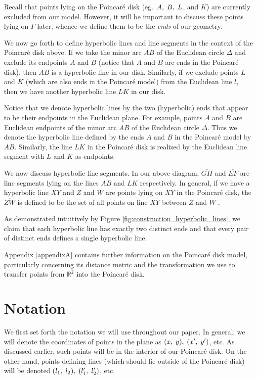 \documentclass[12pt]{article}
\newcommand{\R}{\mathbb{R}}
\newcommand{\ttc}{, \hspace{1mm}}
\newcommand{\poincare}{Poincar\'{e} }
\theoremstyle{plain}
\theoremstyle{definition}
\newcommand{\todo}[1]{\color{magenta} \text{{#1}} \color{black}}
\begin{document}
Recall that points lying on the \poincare disk (eg.~$A\ttc B \ttc L$, and $K$) are currently excluded from our model. However, it will be important to discuss these points lying on $\Gamma$ later, whence we define them to be the \textit{ends} of our geometry. 

We now go forth to define hyperbolic lines and line segments in the context of the \poincare disk above. If we take the minor arc $AB$ of the Euclidean circle $\Delta$ and exclude its endpoints $A$ and $B$ (notice that $A$ and $B$ are ends in the \poincare disk), then $AB$ is a hyperbolic line in our disk. Similarly, if we exclude points $L$ and $K$ (which are also ends in the \poincare model) from the Euclidean line $l$, then we have another hyperbolic line $LK$ in our disk. 

\todo{clunky as shit. will come back}Notice that we denote hyperbolic lines by the two (hyperbolic) ends that appear to be their endpoints in the Euclidean plane. For example, points $A$ and $B$ are Euclidean endpoints of the minor arc $AB$ of the Euclidean circle $\Delta$. Thus we denote the hyperbolic line defined by the ends $A$ and $B$ in the \poincare model by $AB$. Similarly, the line $LK$ in the \poincare disk is realized by the Euclidean line segment with $L$ and $K$ as endpoints. 

We now discuss hyperbolic line segments. In our above diagram, $\overline{GH}$ and $\overline{EF}$ are line segments lying on the lines $AB$ and $LK$ respectively. In general, if we have a hyperbolic line $XY$ and $Z$ and $W$ are points lying on $XY$ in the \poincare disk, the $\overline{ZW}$ is defined to be the set of all points on line $XY$ between $Z$ and $W$ \todo{[LG] including $Z$ and $W$?}.

	As demonstrated intuitively by Figure \ref{fig:construction_hyperbolic_lines}, we claim that each hyperbolic line has exactly two distinct ends and that every pair of distinct ends defines a single hyperbolic line.

	Appendix \ref{appendixA} contains further information on the \poincare disk model, particularly concerning its distance metric and the transformation we use to transfer points from $\R^2$ into the \poincare disk. 

\section{Notation}
	
\hspace{10mm} We first set forth the notation we will use throughout our paper. In general, we will denote the coordinates of points in the plane as $(x \ttc y) \ttc (x' \ttc y')$, etc. As discussed earlier, such points will be in the interior of our \poincare disk. On the other hand, points defining lines (which should lie outside of the \poincare disk) will be denoted $(l_1 \ttc l_2) \ttc (l_1' \ttc l_2')$, etc. 
\end{document}
